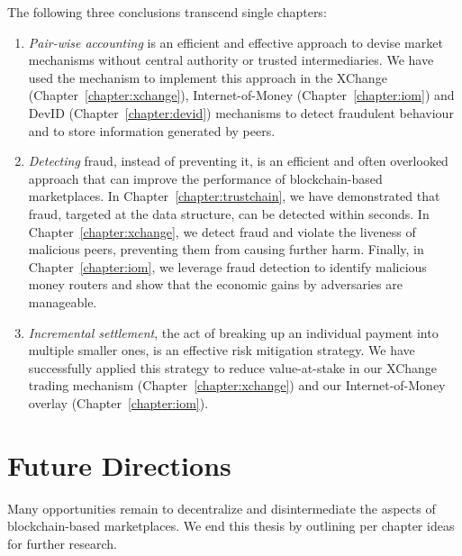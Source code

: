 \noindent The following three conclusions transcend single chapters:

\begin{enumerate}[resume]	
	\item \emph{Pair-wise accounting} is an efficient and effective approach to devise market mechanisms without central authority or trusted intermediaries.
	We have used the \TrustChain{} mechanism to implement this approach in the XChange (Chapter~\ref{chapter:xchange}), Internet-of-Money (Chapter~\ref{chapter:iom}) and DevID (Chapter~\ref{chapter:devid}) mechanisms to detect fraudulent behaviour and to store information generated by peers.
	
	\item \emph{Detecting} fraud, instead of preventing it, is an efficient and often overlooked approach that can improve the performance of blockchain-based marketplaces.
	In Chapter~\ref{chapter:trustchain}, we have demonstrated that fraud, targeted at the \TrustChain{} data structure, can be detected within seconds.
	In Chapter~\ref{chapter:xchange}, we detect fraud and violate the liveness of malicious peers, preventing them from causing further harm.
	Finally, in Chapter~\ref{chapter:iom}, we leverage fraud detection to identify malicious money routers and show that the economic gains by adversaries are manageable.
	
	\item \emph{Incremental settlement}, the act of breaking up an individual payment into multiple smaller ones, is an effective risk mitigation strategy.
	We have successfully applied this strategy to reduce value-at-stake in our XChange trading mechanism (Chapter~\ref{chapter:xchange}) and our Internet-of-Money overlay (Chapter~\ref{chapter:iom}).
	
\end{enumerate}

\section{Future Directions}
Many opportunities remain to decentralize and disintermediate the aspects of blockchain-based marketplaces.
We end this thesis by outlining per chapter ideas for further research.

